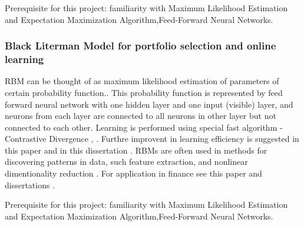 \documentclass{article} %
\begin{document}
Prerequisite for this project: familiarity with Maximum Likelihood Estimation and  Expectation Maximization Algorithm,Feed-Forward Neural Networks.

\subsubsection{Black Literman Model for portfolio selection and online learning}


RBM can be thought of as maximum likelihood estimation of parameters of certain probability  function.. This probability function is represented by feed forward neural network with one hidden layer and one input (visible) layer,  and neurons from each layer are connected to all neurons in other layer but not connected to each other. Learning is performed using   special fast algorithm -  Contrastive Divergence  \cite{HNT},  \cite{ST}.  Furthre improvent in learning efficiency is suggested in this paper \cite{MR} and in this dissertation \cite{HHH}. RBMs  are often used in methods for discovering patterns in data, such feature extraction, and nonlinear dimentionality reduction \cite{BKMM} . For application in finance see this paper \cite{APC} and dissertations \cite{FH,HR}. 

Prerequisite for this project: familiarity with Maximum Likelihood Estimation and  Expectation Maximization Algorithm,Feed-Forward Neural Networks.
\end{document}
